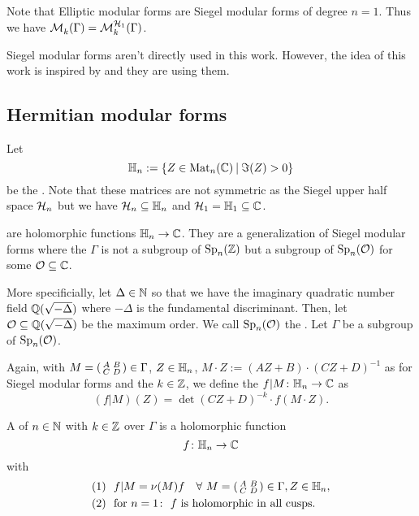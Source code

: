 Note that Elliptic modular forms are Siegel modular forms of degree $n=1$. Thus we have $\operatorname{\mathcal{M}}^{}_k (\Gamma) = \operatorname{\mathcal{M}}^{\mathcal{H}_{1}}_k (\Gamma)$.

Siegel modular forms aren't directly used in this work. However, the idea of this work is inspired by \cite{PoorYuen07Comp} and they are using them.


\subsection{Hermitian modular forms}

Let
\[ \HalfPlane_n :=  \Set{ Z \in \M_n(\C) }{ \Im(Z) > 0} \]
be the . Note that these matrices are not symmetric as the Siegel upper half space $\mathcal{H}_n$ but we have $\mathcal{H}_n \subseteq \mathbb{H}_n$ and $\mathcal{H}_1 = \mathbb{H}_1 \subseteq \mathbb{C}$.

 are holomorphic functions $\mathbb{H}_n \rightarrow \mathbb{C}$. They are a generalization of Siegel modular forms where the  $\Gamma$ is not a subgroup of $\operatorname{Sp}_n(\mathbb{Z})$ but a subgroup of $\operatorname{Sp}_n(\mathcal{O})$ for some $\mathcal{O} \subseteq \mathbb{C}$.


More specificially,
let $\Delta \in \mathbb{N}$ so that we have the imaginary quadratic number field $\mathbb{Q}(\sqrt{-\Delta})$ where $-\Delta$ is the fundamental discriminant.
Then, let $\mathcal{O} \subseteq \mathbb{Q}(\sqrt{-\Delta})$ be the maximum order.
We call $\operatorname{Sp}_n(\mathcal{O})$ the .
Let $\Gamma$ be a subgroup of $\operatorname{Sp}_n(\mathcal{O})$.

Again, with $M = \left( \begin{smallmatrix} A & B \\ C & D \end{smallmatrix} \right) \in \Gamma$, $Z \in \mathbb{H}_n$, $M \cdot Z := (A Z + B) \cdot (C Z + D)^{-1}$ as for Siegel modular forms and the  $k \in \mathbb{Z}$, we define the  $f | M \colon \mathbb{H}_n \rightarrow \mathbb{C}$ as
\[ (f|M) (Z) = \det(CZ + D)^{-k} \cdot f(M \cdot Z) .\]

A 
of  $n\in\mathbb{N}$
with  $k\in \mathbb{Z}$
over $\Gamma$
is a holomorphic function
\[ f \colon \mathbb{H}_n \rightarrow \mathbb{C} \]
with
\begin{align*}
(1) \ \ & f | M = \nu(M) f \quad\forall\ M = \left( \begin{smallmatrix} A & B \\ C & D \end{smallmatrix} \right) \in \Gamma, Z \in \mathbb{H}_n , \\
(2) \ \ & \text{for } n = 1 \colon \ \text{$f$ is holomorphic in all cusps} .
\end{align*}

